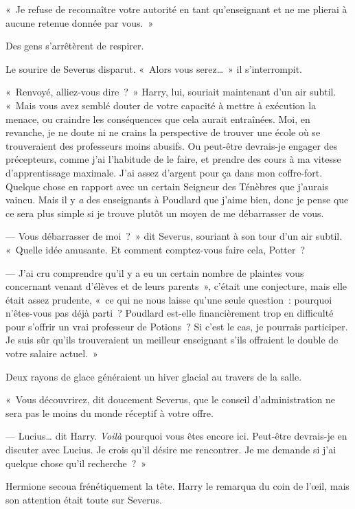 «~Je refuse de reconnaître votre autorité en tant qu'enseignant et ne me plierai à aucune retenue donnée par vous.~»

Des gens s'arrêtèrent de respirer.

Le sourire de Severus disparut. «~Alors vous serez…~» il s'interrompit.

«~Renvoyé, alliez-vous dire~?~» Harry, lui, souriait maintenant d'un air subtil. «~Mais vous avez semblé douter de votre capacité à mettre à exécution la menace, ou craindre les conséquences que cela aurait entraînées. Moi, en revanche, je ne doute ni ne crains la perspective de trouver une école où se trouveraient des professeurs moins abusifs. Ou peut-être devrais-je engager des précepteurs, comme j'ai l'habitude de le faire, et prendre des cours à ma vitesse d'apprentissage maximale. J'ai assez d'argent pour ça dans mon coffre-fort. Quelque chose en rapport avec un certain Seigneur des Ténèbres que j'aurais vaincu. Mais il y \emph{a} des enseignants à Poudlard que j'aime bien, donc je pense que ce sera plus simple si je trouve plutôt un moyen de me débarrasser de vous.

--- Vous débarrasser de moi~?~» dit Severus, souriant à son tour d'un air subtil. «~Quelle idée amusante. Et comment comptez-vous faire cela, Potter~?

--- J'ai cru comprendre qu'il y a eu un certain nombre de plaintes vous concernant venant d'élèves et de leurs parents~», c'était une conjecture, mais elle était assez prudente, «~ce qui ne nous laisse qu'une seule question~: pourquoi n'êtes-vous pas déjà parti~? Poudlard est-elle financièrement trop en difficulté pour s'offrir un vrai professeur de Potions~? Si c'est le cas, je pourrais participer. Je suis sûr qu'ils trouveraient un meilleur enseignant s'ils offraient le double de votre salaire actuel.~»

Deux rayons de glace généraient un hiver glacial au travers de la salle.

«~Vous découvrirez, dit doucement Severus, que le conseil d'administration ne sera pas le moins du monde réceptif à votre offre.

--- Lucius… dit Harry. \emph{Voilà} pourquoi vous êtes encore ici. Peut-être devrais-je en discuter avec Lucius. Je crois qu'il désire me rencontrer. Je me demande si j'ai quelque chose qu'il recherche~?~»

Hermione secoua frénétiquement la tête. Harry le remarqua du coin de l'œil, mais son attention était toute sur Severus.

